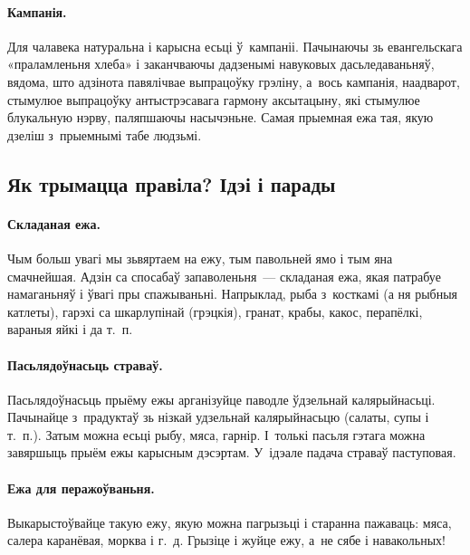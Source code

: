 \paragraph{Кампанія.}
Для чалавека натуральна і карысна есьці ў~кампаніі. Пачынаючы зь евангельскага «праламленьня хлеба» і заканчваючы дадзенымі навуковых дасьледаваньняў, вядома, што адзінота павялічвае выпрацоўку грэліну, а~вось кампанія, наадварот, стымулюе выпрацоўку антыстрэсавага гармону аксытацыну, які стымулюе блукальную нэрву, паляпшаючы насычэньне. Самая прыемная ежа тая, якую дзеліш з~прыемнымі табе людзьмі.

\subsection{Як трымацца правіла? Ідэі і парады}

\paragraph{Складаная ежа.}
Чым больш увагі мы зьвяртаем на ежу, тым павольней ямо і тым яна смачнейшая. Адзін са спосабаў запаволеньня~--- складаная ежа, якая патрабуе намаганьняў і ўвагі пры спажываньні. Напрыклад, рыба з~косткамі (а ня рыбныя катлеты), гарэхі са шкарлупінай (грэцкія), гранат, крабы, какос, перапёлкі, вараныя яйкі і да т.~п.

\paragraph{Пасьлядоўнасьць страваў.}
Пасьлядоўнасьць прыёму ежы арганізуйце паводле ўдзельнай калярыйнасьці. Пачынайце з~прадуктаў зь нізкай удзельнай калярыйнасьцю (салаты, супы і т.~п.). Затым можна есьці рыбу, мяса, гарнір. І~толькі пасьля гэтага можна завяршыць прыём ежы карысным дэсэртам. У~ідэале падача страваў паступовая.

\paragraph{Ежа для перажоўваньня.}
Выкарыстоўвайце такую ежу, якую можна пагрызьці і старанна пажаваць: мяса, салера каранёвая, морква і г.~д. Грызіце і жуйце ежу, а~не сябе і навакольных!


